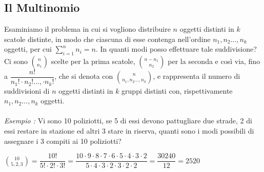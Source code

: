 \documentclass[12pt, letterpaper]{article}
\begin{document}
\subsection{Il Multinomio}
Esaminiamo il problema in cui si vogliono distribuire \(n\) oggetti distinti in \(k\) scatole distinte, in modo che 
ciascuna di esse contenga nell'ordine \(n_1,n_2...,n_k\) oggetti, per cui \(\displaystyle\sum_{i=1}^n n_i =n\). In quanti modi posso 
effettuare tale suddivisione? Ci sono \(\binom{n}{n_1}\) scelte per la prima scatole, \(\binom{n-n_1}{n_2}\) per la seconda 
e così via, fino a \(\dfrac{n!}{n_1!\cdot n_2!...,\cdot n_k!}\), che si denota con \(\displaystyle\binom{n}{n_1,n_2...,n_k}\), e 
rappresenta il numero di suddivisioni di \(n\) oggetti distinti in \(k\) gruppi distinti con, rispettivamente
\(n_1,n_2...,n_k\) oggetti.\\
\hphantom{.}\\\textit{Esempio : }Vi sono 10 poliziotti, se 5 di essi devono pattugliare due strade, 2 di essi 
restare in stazione ed altri 3 stare in riserva, quanti sono i modi possibili di assegnare i 3 compiti ai 
10 poliziotti? \begin{center}
    \(
      \displaystyle\binom{10}{5,2,3}=\dfrac{10!}{5!\cdot2!\cdot3!}=\dfrac{10\cdot9\cdot8\cdot7\cdot6\cdot5\cdot4\cdot3\cdot2}{5\cdot4\cdot3\cdot2\cdot 3 \cdot 2 \cdot 2}=\dfrac{30240}{12}=2520  
    \)
\end{center}
\end{document}
